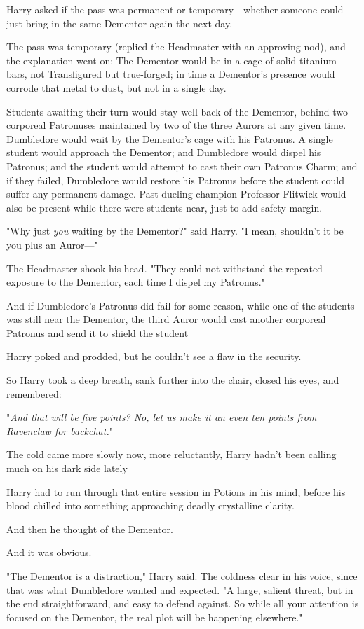 Harry asked if the pass was permanent or temporary—whether someone could just
bring in the same Dementor again the next day.

The pass was temporary (replied the Headmaster with an approving nod), and the
explanation went on: The Dementor would be in a cage of solid titanium bars,
not Transfigured but true-forged; in time a Dementor's presence would corrode
that metal to dust, but not in a single day.

Students awaiting their turn would stay well back of the Dementor, behind two
corporeal Patronuses maintained by two of the three Aurors at any given time.
Dumbledore would wait by the Dementor's cage with his Patronus. A single
student would approach the Dementor; and Dumbledore would dispel his Patronus;
and the student would attempt to cast their own Patronus Charm; and if they
failed, Dumbledore would restore his Patronus before the student could suffer
any permanent damage. Past dueling champion Professor Flitwick would also be
present while there were students near, just to add safety margin.

"Why just \emph{you} waiting by the Dementor?" said Harry. "I mean, shouldn't
it be you plus an Auror—"

The Headmaster shook his head. "They could not withstand the repeated exposure
to the Dementor, each time I dispel my Patronus."

And if Dumbledore's Patronus did fail for some reason, while one of the
students was still near the Dementor, the third Auror would cast another
corporeal Patronus and send it to shield the student{\el}

Harry poked and prodded, but he couldn't see a flaw in the security.

So Harry took a deep breath, sank further into the chair, closed his eyes, and
remembered:

"\emph{And that will be{\el} five points? No, let us make it an even ten
points from Ravenclaw for backchat.}"

The cold came more slowly now, more reluctantly, Harry hadn't been calling much
on his dark side lately{\el}

Harry had to run through that entire session in Potions in his mind, before his
blood chilled into something approaching deadly crystalline clarity.

And then he thought of the Dementor.

And it was obvious.

"The Dementor is a distraction," Harry said. The coldness clear in his voice,
since that was what Dumbledore wanted and expected. "A large, salient threat,
but in the end straightforward, and easy to defend against. So while all your
attention is focused on the Dementor, the real plot will be happening
elsewhere."


